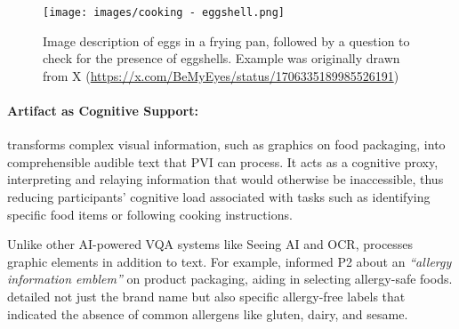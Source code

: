 
\begin{figure}[t!]
\centering
\texttt{[image: images/cooking - eggshell.png]}
\caption{Image description of eggs in a frying pan, followed by a question to check for the presence of eggshells. Example was originally drawn from X (\url{https://x.com/BeMyEyes/status/1706335189985526191})}
\end{figure}


\paragraph{Artifact as Cognitive Support:}

\bma{} transforms complex visual information, such as graphics on food packaging, into comprehensible audible text that PVI can process. It acts as a cognitive proxy, interpreting and relaying information that would otherwise be inaccessible, thus reducing participants' cognitive load associated with tasks such as identifying specific food items or following cooking instructions.


Unlike other AI-powered VQA systems like Seeing AI and OCR, \bma{} processes graphic elements in addition to text. 
% 
For example, \bma{} informed P2 about an \textit{``allergy information emblem''} on product packaging, aiding in selecting allergy-safe foods. \bma{} detailed not just the brand name but also specific allergy-free labels that indicated the absence of common allergens like gluten, dairy, and sesame.  





